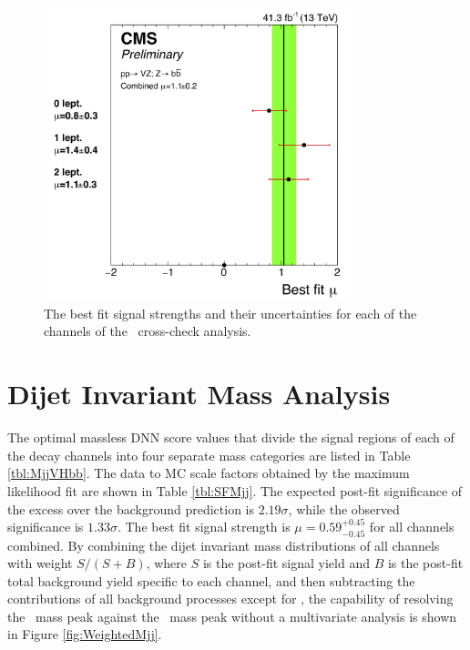 \begin{figure}[htbp]
  \centering
    \includegraphics[width=3.5in]{images/MuVZbb}
    \caption[\VZbb\ Analysis Signal Strengths]{The best fit signal strengths and their uncertainties for each of the channels of the \VZbb\ cross-check analysis.}
    \label{fig:MuVZbb}
\end{figure}

\section{Dijet Invariant Mass Analysis}

The optimal massless DNN score values that divide the signal regions of each of the decay channels into four separate mass categories are listed in Table \ref{tbl:MjjVHbb}. The data to MC scale factors obtained by the maximum likelihood fit are shown in Table \ref{tbl:SFMjj}. The expected post-fit significance of the excess over the background prediction is $2.19\sigma$, while the observed significance is $1.33\sigma$. The best fit signal strength is $\mu = 0.59_{-0.45}^{+0.45}$ for all channels combined. By combining the dijet invariant mass distributions of all channels with weight $S/(S+B)$, where $S$ is the post-fit \VHbb signal yield and $B$ is the post-fit total background yield specific to each channel, and then subtracting the contributions of all background processes except for \VZbb, the capability of resolving the \VHbb\ mass peak against the \VZbb\ mass peak without a multivariate analysis is shown in Figure \ref{fig:WeightedMjj}.

